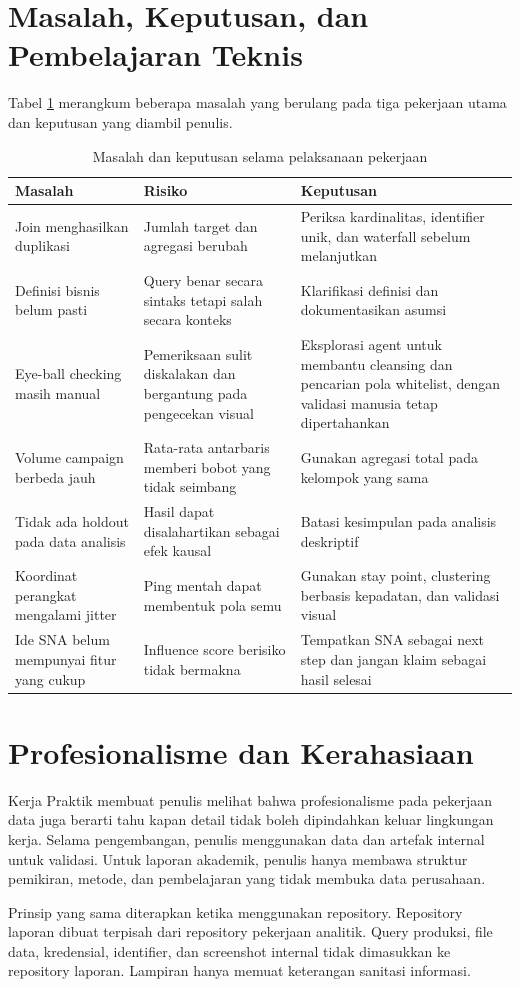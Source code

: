 \section{Masalah, Keputusan, dan Pembelajaran Teknis}
Tabel \ref{tab:masalah-keputusan} merangkum beberapa masalah yang berulang pada tiga pekerjaan utama dan keputusan yang diambil penulis.

\begin{table}[htbp]
\caption{Masalah dan keputusan selama pelaksanaan pekerjaan}
\label{tab:masalah-keputusan}
\centering
\begin{tabularx}{\textwidth}{|p{}|p{}|X|}
\hline
\textbf{Masalah} & \textbf{Risiko} & \textbf{Keputusan} \\
\hline
Join menghasilkan duplikasi & Jumlah target dan agregasi berubah & Periksa kardinalitas, identifier unik, dan waterfall sebelum melanjutkan \\
\hline
Definisi bisnis belum pasti & Query benar secara sintaks tetapi salah secara konteks & Klarifikasi definisi dan dokumentasikan asumsi \\
\hline
Eye-ball checking masih manual & Pemeriksaan sulit diskalakan dan bergantung pada pengecekan visual & Eksplorasi agent untuk membantu cleansing dan pencarian pola whitelist, dengan validasi manusia tetap dipertahankan \\
\hline
Volume campaign berbeda jauh & Rata-rata antarbaris memberi bobot yang tidak seimbang & Gunakan agregasi total pada kelompok yang sama \\
\hline
Tidak ada holdout pada data analisis & Hasil dapat disalahartikan sebagai efek kausal & Batasi kesimpulan pada analisis deskriptif \\
\hline
Koordinat perangkat mengalami jitter & Ping mentah dapat membentuk pola semu & Gunakan stay point, clustering berbasis kepadatan, dan validasi visual \\
\hline
Ide SNA belum mempunyai fitur yang cukup & Influence score berisiko tidak bermakna & Tempatkan SNA sebagai next step dan jangan klaim sebagai hasil selesai \\
\hline
\end{tabularx}
\end{table}

\section{Profesionalisme dan Kerahasiaan}
Kerja Praktik membuat penulis melihat bahwa profesionalisme pada pekerjaan data juga berarti tahu kapan detail tidak boleh dipindahkan keluar lingkungan kerja. Selama pengembangan, penulis menggunakan data dan artefak internal untuk validasi. Untuk laporan akademik, penulis hanya membawa struktur pemikiran, metode, dan pembelajaran yang tidak membuka data perusahaan.

Prinsip yang sama diterapkan ketika menggunakan repository. Repository laporan dibuat terpisah dari repository pekerjaan analitik. Query produksi, file data, kredensial, identifier, dan screenshot internal tidak dimasukkan ke repository laporan. Lampiran hanya memuat keterangan sanitasi informasi.
